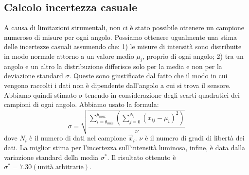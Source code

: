 \subsection{Calcolo incertezza casuale}\label{subsec:calcolo-incertezza-casuale}
  A causa di limitazioni strumentali, non ci è stato possibile ottenere un campione
  numeroso di misure per ogni angolo. Possiamo ottenere ugualmente
  una stima delle incertezze casuali assumendo che:
  1) le misure di intensità sono distribuite in modo normale attorno a un valore
    medio $\mu_i$, proprio di ogni angolo;
  2) tra un angolo e un altro la distribuzione differisce solo per la media e non per la
    deviazione standard $\sigma$.
  Queste sono giustificate dal fatto che il modo in cui vengono raccolti i dati
  non è dipendente dall'angolo a cui si trova il sensore.
  Abbiamo quindi stimato $\sigma$ tenendo in considerazione degli scarti quadratici
  dei campioni di ogni angolo.
  Abbiamo usato la formula:
  \begin{equation}
    \sigma = \sqrt{
      \frac {
        \sum_{i = \theta_{min}}^{\theta_{max}} \left(
          \sum_{j = 0}^{N_i} (x_{ij} -\mu_i)^2
        \right)
      } {
        \nu
      }
    }
  \end{equation}
  \noindent dove $N_i$ è il numero di dati nel campione $\vec{x}_i$.
  $\nu$ è il numero di gradi di libertà dei dati. La miglior stima per l'incertezza
  sull'intensità luminosa, infine, è data dalla variazione standard della media $\sigma^*$.
  Il risultato ottenuto è $\sigma^* = 7.30 (\text{unità arbitrarie})$.
\endinput

